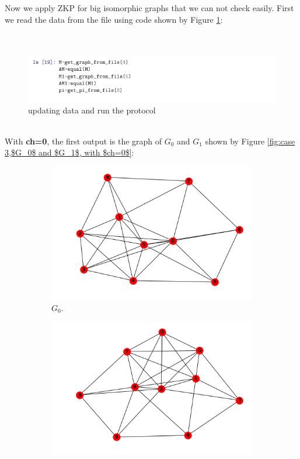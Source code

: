 \documentclass[12pt,a4paper]{article}
\begin{document}
\begin{itemize}
Now we apply ZKP for big isomorphic graphs that we can not check easily. First we read the data from the file using code shown by Figure \ref{fig:3-16}:\\
\\
\\
\begin{figure}[h]
	\centering
	\includegraphics[width=0.95\linewidth]{3-16}
	\caption{updating data and run the protocol}
	\label{fig:3-16}
\end{figure}\\
With \textbf{ch=0}, the first output is the graph of $G_0$ and $G_1$ shown by Figure \ref{fig:case 3,$G_0$ and $G_1$, with $ch=0$}:\\
\begin{figure}[h!]
	\centering\begin{subfigure}[b]{.45\linewidth}
		\includegraphics[width=\linewidth]{3-17.png}
		\caption{$G_0$.}
	\end{subfigure}
	\begin{subfigure}[b]{.45\linewidth}
		\includegraphics[width=\linewidth]{3-18.png}

\end{subfigure}
\end{figure}
\end{itemize}
\end{document}
